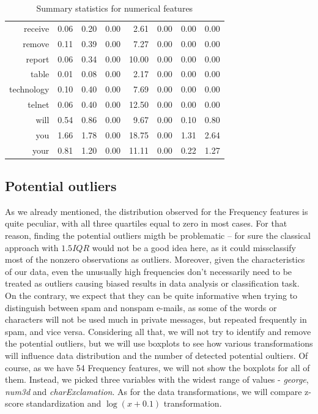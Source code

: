 \documentclass{article}\usepackage[]{graphicx}\usepackage[]{xcolor}
\begin{document}
\begin{table}[ht]
\begin{tabular}{rrrrrrrr}
  receive & 0.06 & 0.20 & 0.00 & 2.61 & 0.00 & 0.00 & 0.00 \\ 
  remove & 0.11 & 0.39 & 0.00 & 7.27 & 0.00 & 0.00 & 0.00 \\ 
  report & 0.06 & 0.34 & 0.00 & 10.00 & 0.00 & 0.00 & 0.00 \\ 
  table & 0.01 & 0.08 & 0.00 & 2.17 & 0.00 & 0.00 & 0.00 \\ 
  technology & 0.10 & 0.40 & 0.00 & 7.69 & 0.00 & 0.00 & 0.00 \\ 
  telnet & 0.06 & 0.40 & 0.00 & 12.50 & 0.00 & 0.00 & 0.00 \\ 
  will & 0.54 & 0.86 & 0.00 & 9.67 & 0.00 & 0.10 & 0.80 \\ 
  you & 1.66 & 1.78 & 0.00 & 18.75 & 0.00 & 1.31 & 2.64 \\ 
  your & 0.81 & 1.20 & 0.00 & 11.11 & 0.00 & 0.22 & 1.27 \\ 
   \hline
\end{tabular}
\caption{Summary statistics for numerical features} 
\label{tab1}
\end{table}


\subsection*{Potential outliers}

As we already mentioned, the distribution observed for the Frequency features is quite peculiar,
with all three quartiles equal to zero in most cases. For that reason, finding the
potential outliers migth be problematic -- for sure the classical approach with $1.5IQR$
would not be a good idea here, as it could missclassify most of the nonzero observations 
as outliers. Moreover, given the characteristics of our data, even the unusually high
frequencies don't necessarily need to be treated as outliers causing biased results
in data analysis or classification task. On the contrary, we expect that they can be 
quite informative when trying to distinguish between spam and nonspam e-mails, as 
some of the words or characters will not be used much in private messages, but repeated
frequently in spam, and vice versa. Considering all that, we will not try to identify and 
remove the potential outliers, but we will use boxplots to see how various transformations
will influence data distribution and the number of detected potential oultiers. Of course, 
as we have 54 Frequency features, we will not show the boxplots for all of them.
Instead, we picked three variables with the widest range of values - \textit{george},
\textit{num3d} and \textit{charExclamation}. As for the data transformations, 
we will compare z-score standardization and $\log(x+0.1)$ transformation.
\end{document}
